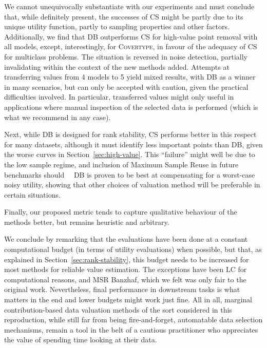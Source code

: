 \documentclass[10pt]{article}
\newcommand{\tmname}[1]{\textsc{#1}}
\begin{document}
We cannot unequivocally substantiate  with our
experiments and must conclude that, while definitely present, the successes of
CS might be partly due to its unique utility function, partly to sampling
properties and other factors. Additionally, we find that DB outperforms CS for
high-value point removal with all models, except, interestingly, for
{\tmname{Covertype}}, in favour of the adequacy of CS for multiclass problems.
The situation is reversed in noise detection, partially invalidating
 within the context of the new methods added.
Attempts at transferring values from 4 models to 5 yield mixed results, with
DB as a winner in many scenarios, but  can only
be accepted with caution, given the practical difficulties involved. In
particular, transferred values might only useful in applications where manual
inspection of the selected data is performed (which is what we recommend in
any case).

Next, while DB is designed for rank stability, CS performs better in this
respect for many datasets, although it must identify less important points
than DB, given the worse curves in  Section~\ref{sec:high-value}. This
``failure'' might well be due to the low sample regime, and inclusion of
Maximum Sample Reuse in future benchmarks should \ \ DB is proven to be best
at compensating for a worst-case noisy utility, showing that other choices of
valuation method will be preferable in certain situations.

Finally, our proposed metric  tends to capture qualitative
behaviour of the methods better, but remains heuristic and arbitrary.

We conclude by remarking that the evaluations have been done at a constant
computational budget (in terms of utility evaluations) when possible, but
that, as explained in  Section~\ref{sec:rank-stability}, this budget needs to
be increased for most methods for reliable value estimation. The exceptions
have been LC for computational reasons, and MSR Banzhaf, which we felt was
only fair to the original work. Nevertheless, final performance in downstream
tasks is what matters in the end and lower budgets might work just fine. All
in all, marginal contribution-based data valuation methods of the sort
considered in this reproduction, while still far from being fire-and-forget,
automatable data selection mechanisms, remain a tool in the belt of a cautious
practitioner who appreciates the value of spending time looking at their data.
\end{document}
